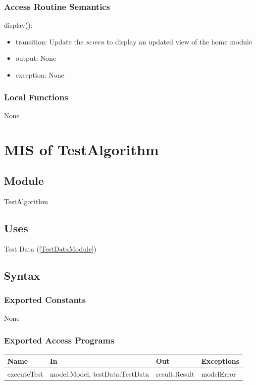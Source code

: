 \documentclass[12pt, titlepage]{article}
\begin{document}
\subsubsection{Access Routine Semantics}

\noindent display():
\begin{itemize}
\item transition: Update the \textit{screen} to display an updated view of the home module
\item output: None
\item exception: None
\end{itemize}

\subsubsection{Local Functions}

None

\newpage

\section{MIS of TestAlgorithm} \label{TestAlgorithmModule}

\subsection{Module}

TestAlgorithm

\subsection{Uses}

Test Data (\ref{TestDataModule})

\subsection{Syntax}

\subsubsection{Exported Constants}

None

\subsubsection{Exported Access Programs}

\begin{center}
\begin{tabular}{p{2cm} p{4cm} p{4cm} p{2cm}}
\hline
\textbf{Name} & \textbf{In} & \textbf{Out} & \textbf{Exceptions} \\
\hline
executeTest & model:Model, testData:TestData  & result:Result & modelError \\
\hline
\end{tabular}
\end{center}
\end{document}
